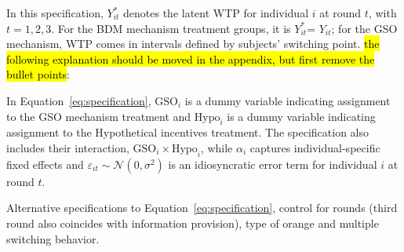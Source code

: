 \documentclass[12pt]{article}
\begin{document}
In this specification, $Y_{it}^*$ denotes the latent WTP for individual $i$ at round $t$, with $t = 1, 2, 3$. For the BDM mechanism treatment groups, it is  $Y_{it}^*$= $Y_{it}$; for the GSO mechanism, WTP comes in intervals defined by subjects' switching point. \hl{the following explanation should be moved in the appendix, but first remove the bullet points}:

In Equation~\ref{eq:specification}, $\text{GSO}_i$ is a dummy variable indicating assignment to the GSO mechanism treatment and $\text{Hypo}_i$ is a dummy variable indicating assignment to the Hypothetical incentives treatment. The specification also includes their interaction, $\text{GSO}_i \times \text{Hypo}_i$, while $\alpha_i$ captures individual-specific fixed effects and $\varepsilon_{it} \sim \mathcal{N}(0, \sigma^2)$ is an idiosyncratic error term for individual $i$ at round $t$.
    

Alternative specifications to Equation~\ref{eq:specification}, control for rounds (third round also coincides with information provision), type of orange and multiple switching behavior.
\end{document}
